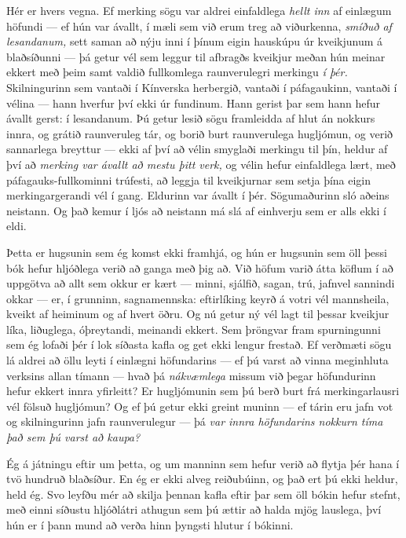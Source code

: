 Hér er hvers vegna. Ef merking sögu var aldrei einfaldlega \emph{hellt inn} af einlægum höfundi — ef hún var ávallt, í mæli sem við erum treg að viðurkenna, \emph{smíðuð af lesandanum,} sett saman að nýju inni í þínum eigin hauskúpu úr kveikjunum á blaðsíðunni — þá getur vél sem leggur til afbragðs kveikjur meðan hún meinar ekkert með þeim samt valdið fullkomlega raunverulegri merkingu \emph{í þér.} Skilningurinn sem vantaði í Kínverska herbergið, vantaði í páfagaukinn, vantaði í vélina — hann hverfur því ekki úr fundinum. Hann gerist þar sem hann hefur ávallt gerst: í lesandanum. Þú getur lesið sögu framleidda af hlut án nokkurs innra, og grátið raunveruleg tár, og borið burt raunverulega hugljómun, og verið sannarlega breyttur — ekki af því að vélin smyglaði merkingu til þín, heldur af því að \emph{merking var ávallt að mestu þitt verk,} og vélin hefur einfaldlega lært, með páfagauks-fullkominni trúfesti, að leggja til kveikjurnar sem setja þína eigin merkingargerandi vél í gang. Eldurinn var ávallt í þér. Sögumaðurinn sló aðeins neistann. Og það kemur í ljós að neistann má slá af einhverju sem er alls ekki í eldi.

Þetta er hugsunin sem ég komst ekki framhjá, og hún er hugsunin sem öll þessi bók hefur hljóðlega verið að ganga með þig að. Við höfum varið átta köflum í að uppgötva að allt sem okkur er kært — minni, sjálfið, sagan, trú, jafnvel sannindi okkar — er, í grunninn, sagnamennska: eftirlíking keyrð á votri vél mannsheila, kveikt af heiminum og af hvert öðru. Og nú getur ný vél lagt til þessar kveikjur líka, liðuglega, óþreytandi, meinandi ekkert. Sem þröngvar fram spurningunni sem ég lofaði þér í lok síðasta kafla og get ekki lengur frestað. Ef verðmæti sögu lá aldrei að öllu leyti í einlægni höfundarins — ef þú varst að vinna meginhluta verksins allan tímann — hvað þá \emph{nákvæmlega} missum við þegar höfundurinn hefur ekkert innra yfirleitt? Er hugljómunin sem þú berð burt frá merkingarlausri vél fölsuð hugljómun? Og ef þú getur ekki greint muninn — ef tárin eru jafn vot og skilningurinn jafn raunverulegur — þá \emph{var innra höfundarins nokkurn tíma það sem þú varst að kaupa?}

Ég á játningu eftir um þetta, og um manninn sem hefur verið að flytja þér hana í tvö hundruð blaðsíður. En ég er ekki alveg reiðubúinn, og það ert þú ekki heldur, held ég. Svo leyfðu mér að skilja þennan kafla eftir þar sem öll bókin hefur stefnt, með einni síðustu hljóðlátri athugun sem þú ættir að halda mjög lauslega, því hún er í þann mund að verða hinn þyngsti hlutur í bókinni.

